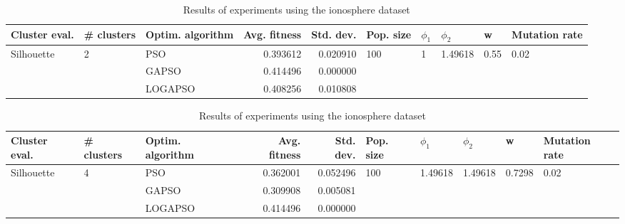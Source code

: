 \documentclass{article}
\begin{document}
\begin{table}
\centering
\caption{Results of experiments using the ionosphere dataset}
\begin{tabular}{lllrrlllll}
\toprule
              Cluster eval. &        \# clusters & Optim. algorithm &  Avg. fitness &  Std. dev. &            Pop. size &         $\phi_{1}$ &               $\phi_{2}$ &                     w &         Mutation rate \\
\midrule
\multirow{3}{*}{Silhouette} & \multirow{3}{*}{2} &              PSO &      0.393612 &   0.020910 & \multirow{3}{*}{100} & \multirow{3}{*}{1} & \multirow{3}{*}{1.49618} & \multirow{3}{*}{0.55} & \multirow{3}{*}{0.02} \\
                            &                    &            GAPSO &      0.414496 &   0.000000 &                      &                    &                          &                       &                       \\
                            &                    &          LOGAPSO &      0.408256 &   0.010808 &                      &                    &                          &                       &                       \\
\bottomrule
\end{tabular}
\end{table}
\begin{table}
\centering
\caption{Results of experiments using the ionosphere dataset}
\begin{tabular}{lllrrlllll}
\toprule
              Cluster eval. &        \# clusters & Optim. algorithm &  Avg. fitness &  Std. dev. &            Pop. size &               $\phi_{1}$ &               $\phi_{2}$ &                       w &         Mutation rate \\
\midrule
\multirow{3}{*}{Silhouette} & \multirow{3}{*}{4} &              PSO &      0.362001 &   0.052496 & \multirow{3}{*}{100} & \multirow{3}{*}{1.49618} & \multirow{3}{*}{1.49618} & \multirow{3}{*}{0.7298} & \multirow{3}{*}{0.02} \\
                            &                    &            GAPSO &      0.309908 &   0.005081 &                      &                          &                          &                         &                       \\
                            &                    &          LOGAPSO &      0.414496 &   0.000000 &                      &                          &                          &                         &                       \\
\bottomrule
\end{tabular}
\end{table}
\end{document}
